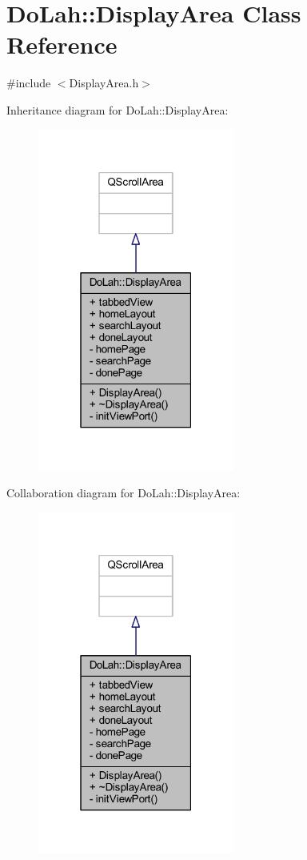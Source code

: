 \hypertarget{class_do_lah_1_1_display_area}{}\section{Do\+Lah\+:\+:Display\+Area Class Reference}
\label{class_do_lah_1_1_display_area}


{\ttfamily \#include $<$Display\+Area.\+h$>$}



Inheritance diagram for Do\+Lah\+:\+:Display\+Area\+:
\nopagebreak
\begin{figure}[H]
\begin{center}
\leavevmode
\includegraphics[width=183pt]{class_do_lah_1_1_display_area__inherit__graph}
\end{center}
\end{figure}


Collaboration diagram for Do\+Lah\+:\+:Display\+Area\+:
\nopagebreak
\begin{figure}[H]
\begin{center}
\leavevmode
\includegraphics[width=183pt]{class_do_lah_1_1_display_area__coll__graph}
\end{center}
\end{figure}
